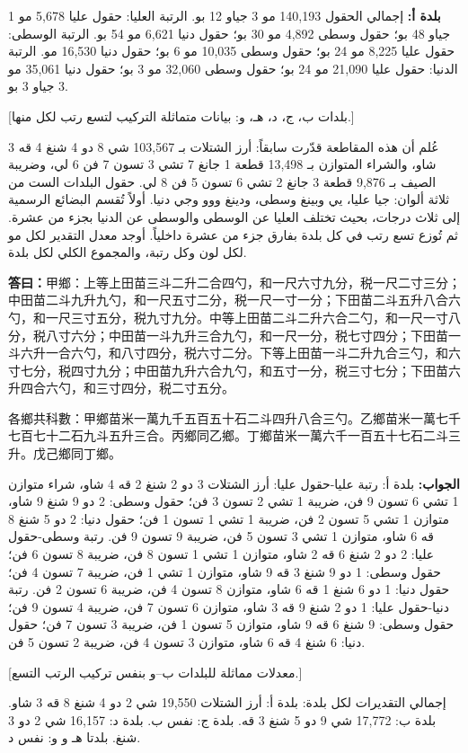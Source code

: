 \documentclass[11pt,a4paper]{article}
\newcommand{\answer}[2]{\par\noindent%
  \begin{minipage}[t]{0.48\textwidth}\textbf{答曰：}#1\end{minipage}%
  \hfill%
  \begin{minipage}[t]{0.48\textwidth}\arabicfont\beginR\textbf{الجواب:} #2\endR\end{minipage}\par\vspace{0.2cm}}
\begin{document}
{\textbf{بلدة أ:} إجمالي الحقول 140,193 مو 3 جياو 12 بو. الرتبة العليا: حقول عليا 5,678 مو 1 جياو 48 بو؛ حقول وسطى 4,892 مو 30 بو؛ حقول دنيا 6,621 مو 54 بو. الرتبة الوسطى: حقول عليا 8,225 مو 24 بو؛ حقول وسطى 10,035 مو 6 بو؛ حقول دنيا 16,530 مو. الرتبة الدنيا: حقول عليا 21,090 مو 24 بو؛ حقول وسطى 32,060 مو 3 بو؛ حقول دنيا 35,061 مو 3 جياو 3 بو.

[بلدات ب، ج، د، هـ، و: بيانات متماثلة التركيب لتسع رتب لكل منها.]

عُلم أن هذه المقاطعة قدّرت سابقاً: أرز الشتلات بـ 103,567 شي 8 دو 4 شنغ 4 قه 3 شاو، والشراء المتوازن بـ 13,498 قطعة 1 جانغ 7 تشي 3 تسون 7 فن 6 لي، وضريبة الصيف بـ 9,876 قطعة 3 جانغ 2 تشي 6 تسون 5 فن 8 لي. حقول البلدات الست من ثلاثة ألوان: جيا عليا، يي وبينغ وسطى، ودينغ ووو وجي دنيا. أولاً تُقسم البضائع الرسمية إلى ثلاث درجات، بحيث تختلف العليا عن الوسطى والوسطى عن الدنيا بجزء من عشرة. ثم تُوزع تسع رتب في كل بلدة بفارق جزء من عشرة داخلياً. أوجد معدل التقدير لكل مو لكل لون وكل رتبة، والمجموع الكلي لكل بلدة.}

\answer{甲鄉：上等上田苗三斗二升二合四勺，和一尺六寸九分，税一尺二寸三分；中田苗二斗九升九勺，和一尺五寸二分，税一尺一寸一分；下田苗二斗五升八合六勺，和一尺三寸五分，税九寸九分。中等上田苗二斗二升六合二勺，和一尺一寸八分，税八寸六分；中田苗一斗九升三合九勺，和一尺一分，税七寸四分；下田苗一斗六升一合六勺，和八寸四分，税六寸二分。下等上田苗一斗二升九合三勺，和六寸七分，税四寸九分；中田苗九升六合九勺，和五寸一分，税三寸七分；下田苗六升四合六勺，和三寸四分，税二寸五分。

各鄉共科數：甲鄉苗米一萬九千五百五十石二斗四升八合三勺。乙鄉苗米一萬七千七百七十二石九斗五升三合。丙鄉同乙鄉。丁鄉苗米一萬六千一百五十七石二斗三升。戊己鄉同丁鄉。}{بلدة أ: رتبة عليا-حقول عليا: أرز الشتلات 3 دو 2 شنغ 2 قه 4 شاو، شراء متوازن 1 تشي 6 تسون 9 فن، ضريبة 1 تشي 2 تسون 3 فن؛ حقول وسطى: 2 دو 9 شنغ 9 شاو، متوازن 1 تشي 5 تسون 2 فن، ضريبة 1 تشي 1 تسون 1 فن؛ حقول دنيا: 2 دو 5 شنغ 8 قه 6 شاو، متوازن 1 تشي 3 تسون 5 فن، ضريبة 9 تسون 9 فن. رتبة وسطى-حقول عليا: 2 دو 2 شنغ 6 قه 2 شاو، متوازن 1 تشي 1 تسون 8 فن، ضريبة 8 تسون 6 فن؛ حقول وسطى: 1 دو 9 شنغ 3 قه 9 شاو، متوازن 1 تشي 1 فن، ضريبة 7 تسون 4 فن؛ حقول دنيا: 1 دو 6 شنغ 1 قه 6 شاو، متوازن 8 تسون 4 فن، ضريبة 6 تسون 2 فن. رتبة دنيا-حقول عليا: 1 دو 2 شنغ 9 قه 3 شاو، متوازن 6 تسون 7 فن، ضريبة 4 تسون 9 فن؛ حقول وسطى: 9 شنغ 6 قه 9 شاو، متوازن 5 تسون 1 فن، ضريبة 3 تسون 7 فن؛ حقول دنيا: 6 شنغ 4 قه 6 شاو، متوازن 3 تسون 4 فن، ضريبة 2 تسون 5 فن.

[معدلات مماثلة للبلدات ب--و بنفس تركيب الرتب التسع.]

إجمالي التقديرات لكل بلدة: بلدة أ: أرز الشتلات 19,550 شي 2 دو 4 شنغ 8 قه 3 شاو. بلدة ب: 17,772 شي 9 دو 5 شنغ 3 قه. بلدة ج: نفس ب. بلدة د: 16,157 شي 2 دو 3 شنغ. بلدتا هـ و و: نفس د.}
\end{document}
